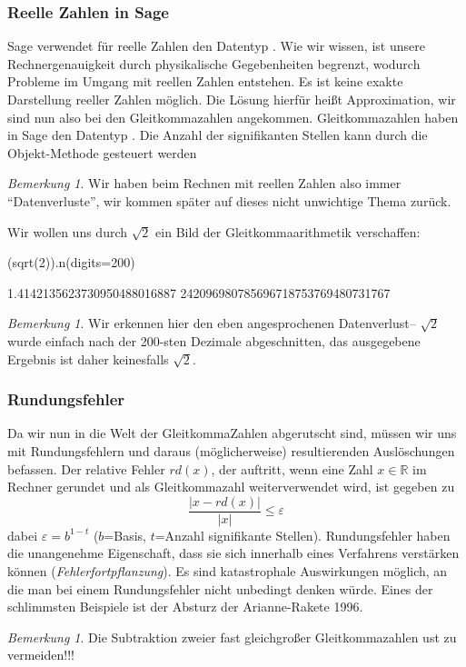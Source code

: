 \documentclass[fontsize=12pt,paper=a4,twoside,bibtotoc,idxtotoc,
liststotoc,pagesize,BCOR1.2cm,DIV15,chapterprefix,pagesize=pdftex]{scrbook}
\theoremstyle{plain}
\theoremstyle{definition}
\theoremstyle{remark}
\newtheorem{bem}[equation]{Bemerkung}
\begin{document}
\subsubsection{Reelle Zahlen in Sage}
Sage verwendet für reelle Zahlen den Datentyp . Wie wir wissen, ist unsere Rechnergenauigkeit durch physikalische 
Gegebenheiten begrenzt, wodurch Probleme im Umgang mit reellen Zahlen entstehen. Es ist keine exakte Darstellung reeller Zahlen 
möglich. Die Lösung hierfür heißt Approximation, wir sind nun also bei den Gleitkommazahlen angekommen. Gleitkommazahlen haben in 
Sage den Datentyp .
 Die Anzahl der signifikanten Stellen kann durch die Objekt-Methode  gesteuert werden
\begin{bem}
 Wir haben beim Rechnen mit reellen Zahlen also immer ``Datenverluste'', wir kommen später auf dieses nicht unwichtige Thema zurück.
\end{bem}
Wir wollen uns durch $\sqrt{2}$ ein Bild der Gleitkommaarithmetik verschaffen:
\begin{sagein}
(sqrt(2)).n(digits=200)
\end{sagein}
\begin{sageout}
1.4142135623730950488016887
242096980785696718753769480731767
\end{sageout}
\begin{bem}
 Wir erkennen hier den eben angesprochenen Datenverlust-- $\sqrt{2}$ wurde einfach nach der 200-sten Dezimale abgeschnitten, das ausgegebene 
Ergebnis ist daher keinesfalls $\sqrt{2}$.
\end{bem}
\subsubsection{Rundungsfehler}
Da wir nun in die Welt der GleitkommaZahlen abgerutscht sind, müssen wir uns mit Rundungsfehlern und daraus (möglicherweise) 
resultierenden Auslöschungen befassen. Der relative Fehler $rd(x)$, der auftritt, wenn eine Zahl $x \in \mathbb{R}$ im Rechner 
gerundet und als Gleitkommazahl weiterverwendet wird, ist gegeben zu
\[ \frac{|x -rd(x)|}{|x|} \leq \varepsilon \]
dabei $\varepsilon=b^{1-t}$ ($b$=Basis, $t$=Anzahl signifikante Stellen).
 Rundungsfehler haben die unangenehme Eigenschaft, dass sie sich innerhalb eines Verfahrens verstärken können ({\it Fehlerfortpflanzung}).
Es sind katastrophale Auswirkungen möglich, an die man bei einem Rundungsfehler nicht unbedingt denken würde. Eines der schlimmsten 
Beispiele ist der Absturz der Arianne-Rakete 1996.
\begin{bem}
 Die Subtraktion zweier fast gleichgroßer Gleitkommazahlen ust zu vermeiden!!!
\end{bem}
\end{document}
